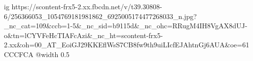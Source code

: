  
 
 
 
 

\ifcmt
  ig https://scontent-frx5-2.xx.fbcdn.net/v/t39.30808-6/256366053_1054769181981862_6925005174477268033_n.jpg?_nc_cat=109&ccb=1-5&_nc_sid=b9115d&_nc_ohc=RRugM4IH8VgAX8dUJ-o&tn=lCYVFeHcTIAFcAzi&_nc_ht=scontent-frx5-2.xx&oh=00_AT_EoiGJ29KKEflWsS7CB8fw9th9uiLIcfEJAhtnGj6AUA&oe=61CCCFCA
  @width 0.5
\fi
